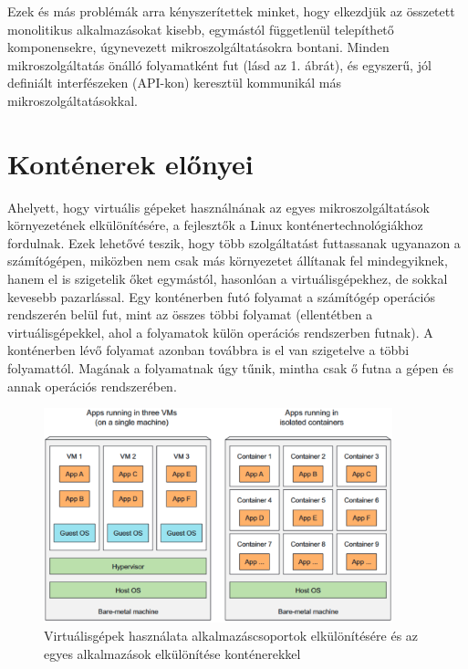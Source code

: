 Ezek és más problémák arra kényszerítettek minket, hogy elkezdjük az összetett monolitikus alkalmazásokat kisebb, egymástól függetlenül telepíthető komponensekre, úgynevezett mikroszolgáltatásokra bontani. Minden mikroszolgáltatás önálló folyamatként fut (lásd az 1. ábrát), és egyszerű, jól definiált interfészeken (API-kon) keresztül kommunikál más mikroszolgáltatásokkal.
\cite{Marko17}

\section{Konténerek előnyei}
Ahelyett, hogy virtuális gépeket használnának az egyes mikroszolgáltatások környezetének
elkülönítésére, a fejlesztők a Linux konténertechnológiákhoz fordulnak. Ezek lehetővé teszik, hogy több szolgáltatást futtassanak ugyanazon a számítógépen, miközben nem csak más környezetet állítanak fel mindegyiknek, hanem el is szigetelik őket egymástól, hasonlóan a virtuálisgépekhez, de sokkal kevesebb pazarlással. Egy konténerben futó folyamat a számítógép operációs rendszerén belül fut, mint az összes többi folyamat (ellentétben a virtuálisgépekkel, ahol a folyamatok külön operációs rendszerben futnak). A konténerben lévő folyamat azonban továbbra is el van szigetelve a többi folyamattól. Magának a folyamatnak úgy tűnik, mintha csak ő futna a gépen és annak operációs rendszerében.
\cite{Marko17}

\begin{figure}[ht]
    \centering
         \includegraphics[width=0.9\textwidth]{figures/docker/vm-vs-containers.png}
          \caption{Virtuálisgépek használata alkalmazáscsoportok elkülönítésére és az egyes alkalmazások elkülönítése konténerekkel \cite{Marko17}}
           \label{vm-vs-containers}
\end{figure}

